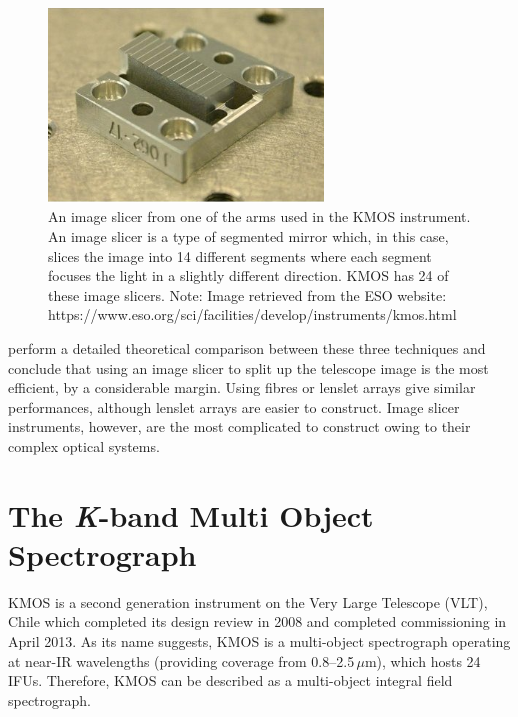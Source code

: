 \begin{figure}
 \centering
 \includegraphics[width=0.65\textwidth]{kmos/kmos-image-slicer}
 \caption[The KMOS image slicer]{An image slicer from one of the arms used in the KMOS instrument.
 An image slicer is a type of segmented mirror which, in this case, slices the image into 14 different segments where each segment focuses the light in a slightly different direction.
 KMOS has 24 of these image slicers.
 Note: Image retrieved from the ESO website: https://www.eso.org/sci/facilities/develop/instruments/kmos.html
 \label{fig:image_slicer}}
\end{figure}


\cite{2006NewAR..50..244A} perform a detailed theoretical comparison between these three techniques and conclude that using an image slicer to split up the telescope image is the most efficient, by a considerable margin.
Using fibres or lenslet arrays give similar performances, although lenslet arrays are easier to construct.
Image slicer instruments, however, are the most complicated to construct owing to their complex optical systems.





\section{The {\it K}-band Multi Object Spectrograph} %
\label{sec:KMOS}
KMOS is a second generation instrument on the Very Large Telescope (VLT), Chile which completed its design review in 2008 and completed commissioning in April 2013.
As its name suggests, KMOS is a multi-object spectrograph operating at near-IR wavelengths (providing coverage from 0.8--2.5\,$\mu$m), which hosts 24 IFUs.
Therefore, KMOS can be described as a multi-object integral field spectrograph.

